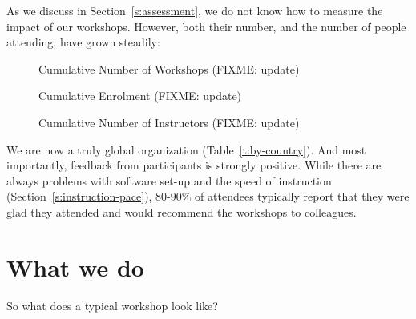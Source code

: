 \documentclass[10pt,a4paper,twocolumn]{article}
\begin{document}
As we discuss in Section~\ref{s:assessment}, we do not know how to
measure the impact of our workshops.  However, both their number, and
the number of people attending, have grown steadily:

\begin{figure}
\centering
\caption{Cumulative Number of Workshops (FIXME: update)}
\label{f:workshops}
\end{figure}

\begin{figure}
\centering
\caption{Cumulative Enrolment (FIXME: update)}
\label{f:enrolment}
\end{figure}

\begin{figure}
\centering
\caption{Cumulative Number of Instructors (FIXME: update)}
\label{f:instructors}
\end{figure}

We are now a truly global organization (Table~\ref{t:by-country}).
And most importantly, feedback from participants is strongly positive.
While there are always problems with software set-up and the speed of
instruction (Section~\ref{s:instruction-pace}), 80-90\% of attendees
typically report that they were glad they attended and would recommend
the workshops to colleagues.

\section{What we do}\label{s:curriculum}

So what does a typical workshop look like?
\end{document}
